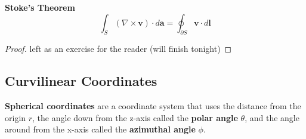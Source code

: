 \documentclass{article}
\begin{document}
\begin{theorem}{\textbf{Stoke's Theorem}}
    \[
        \int_S (\nabla \times \mathbf{v} )\cdot d \mathbf{a} =\oint_{\partial S} \mathbf{v} \cdot d \mathbf{l} 
    \]
\end{theorem}
\begin{proof}
    left as an exercise for the reader (will finish tonight)
\end{proof}

\subsection{Curvilinear Coordinates}
\begin{definition}
    \textbf{Spherical coordinates} are a coordinate system that uses the distance from the origin \(r\), the angle down from the z-axis called the \textbf{polar angle} \(\theta\), 
    and the angle around from the x-axis called the \textbf{azimuthal angle} \(\phi\). 
\end{definition}
\end{document}
